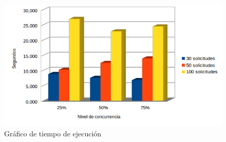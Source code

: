 \begin{figure}[!ht]
	\begin{center}
		\includegraphics[width=1\textwidth]{../images/gra_te.png}
		\caption{Gráfico de tiempo de ejecución}
		\label{fig:gra_te}
	\end{center}
\end{figure}

\newpage
